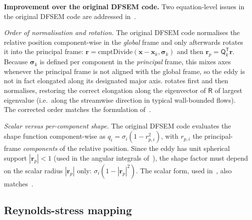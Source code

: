 \documentclass[
 amsmath,amssymb,
 aps,
 twocolumn,
]{revtex4-2}
\renewcommand{\vec}[1]{\boldsymbol{#1}}
\newcommand{\bR}{\mathsf{R}}
\newcommand{\bQ}{\mathsf{Q}}
\newcommand{\improv}[1]{\par\medskip\noindent\textbf{#1}\hspace{0.5em}\ignorespaces}
\begin{document}
\improv{Improvement over the original DFSEM code.}
Two equation-level issues in the original DFSEM code are addressed
in~.

\smallskip\noindent\textit{Order of normalisation and rotation.}
The original DFSEM code normalises the relative position component-wise
in the \emph{global} frame and only afterwards rotates it into the
principal frame:
$\vec r=\mathrm{cmptDivide}(\vec x-\vec x_k,\vec\sigma_k)$ and then
$\vec r_p=\bQ_k^{\mathsf T}\vec r$. Because $\vec\sigma_k$ is defined
per component in the \emph{principal} frame, this mixes axes whenever the
principal frame is not aligned with the global frame, so the eddy is not
in fact elongated along its designated major axis.  rotates
first and then normalises, restoring the correct elongation along the
eigenvector of $\bR$ of largest eigenvalue (i.e.\ along the streamwise
direction in typical wall-bounded flows). The corrected order matches the
formulation of~\cite{PCR2013}.

\smallskip\noindent\textit{Scalar versus per-component shape.}
The original DFSEM code evaluates the shape function component-wise as
$q_i=\sigma_i(1-r_{p,i}^2)$, with $r_{p,i}$ the principal-frame
\emph{components} of the relative position. Since the eddy has unit
spherical support $|\vec r_p|<1$ (used in the angular integrals
of~), the shape factor must depend on the scalar
radius $|\vec r_p|$ only:
$\sigma_i(1-|\vec r_p|^2)$. The scalar form, used in~,
also matches~\cite{PCR2013}.

\subsection{Reynolds-stress mapping}\label{sec:Rmap}
\end{document}

